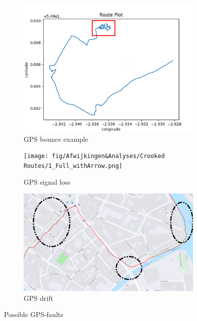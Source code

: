 \documentclass[conference]{IEEEtran}
\begin{document}
\begin{figure}[h]
    \centering
    \begin{subfigure}[b]{.48\linewidth}
        \centering
        \caption{GPS bounce example}
        \includegraphics[width=\textwidth]{fig/Afwijkingen&Analyses/Crooked Routes/Crooked GPS Route_Cart.png}
    \end{subfigure}
    \begin{subfigure}[b]{.38\linewidth}
        \centering
        \caption{GPS signal loss}
        \texttt{[image: fig/Afwijkingen\&Analyses/Crooked Routes/1\_Full\_withArrow.png]}
    \end{subfigure}
    \begin{subfigure}[b]{0.6\linewidth}
        \centering
        \caption{GPS drift}
        \includegraphics[width=\textwidth]{fig/Afwijkingen&Analyses/Crooked Routes/GPS-Drift.png}
    \end{subfigure}
    \caption{Possible GPS-faults}
\end{figure}
\end{document}
